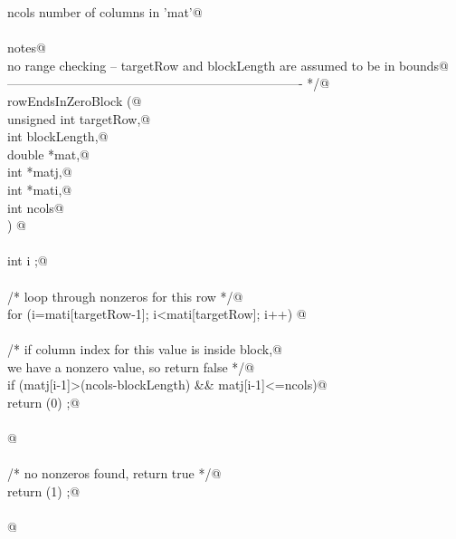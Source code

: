 \documentclass[12pt]{article}
\begin{document}
\begin{flushleft}
\begin{minipage}{\linewidth}
\begin{list}{}{}
\mbox{}\verb@        ncols                           number of columns in 'mat'@\\
\mbox{}\verb@@\\
\mbox{}\verb@ notes@\\
\mbox{}\verb@ no range checking -- targetRow and blockLength are assumed to be in bounds@\\
\mbox{}\verb@---------------------------------------------------------------------- */@\\
\mbox{}\verb@int rowEndsInZeroBlock (@\\
\mbox{}\verb@ unsigned       int targetRow,@\\
\mbox{}\verb@unsigned        int blockLength,@\\
\mbox{}\verb@        double *mat,@\\
\mbox{}\verb@unsigned        int *matj,@\\
\mbox{}\verb@unsigned        int *mati,@\\
\mbox{}\verb@unsigned        int ncols@\\
\mbox{}\verb@) {@\\
\mbox{}\verb@@\\
\mbox{}\verb@unsigned        int i ;@\\
\mbox{}\verb@@\\
\mbox{}\verb@        /* loop through nonzeros for this row */@\\
\mbox{}\verb@        for (i=mati[targetRow-1]; i<mati[targetRow]; i++) {@\\
\mbox{}\verb@@\\
\mbox{}\verb@                /* if column index for this value is inside block,@\\
\mbox{}\verb@               we have a nonzero value, so return false */@\\
\mbox{}\verb@                if (matj[i-1]>(ncols-blockLength) && matj[i-1]<=ncols)@\\
\mbox{}\verb@                        return (0) ;@\\
\mbox{}\verb@@\\
\mbox{}\verb@        }@\\
\mbox{}\verb@@\\
\mbox{}\verb@        /* no nonzeros found, return true */@\\
\mbox{}\verb@        return (1) ;@\\
\mbox{}\verb@@\\
\mbox{}\verb@}@\\
\mbox{}\verb@@\\

\end{list}
\end{minipage}
\end{flushleft}
\end{document}

